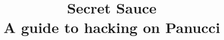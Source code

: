 \documentclass{article}
\begin{document}
\title{%
Secret Sauce \\
\large A guide to hacking on Panucci}
\maketitle
\begin{flushleft}
  \pagebreak
\end{flushleft}
\end{document}
